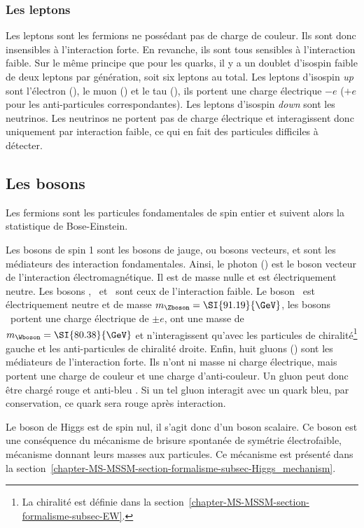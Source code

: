 \subsubsection{Les leptons}\label{chapter-MS-MSSM-section-SM_ptcs-subsec-fermions-subsubsec-leptons}
Les leptons sont les fermions ne possédant pas de charge de couleur. Ils sont donc insensibles à l'interaction forte. En revanche, ils sont tous sensibles à l'interaction faible.
Sur le même principe que pour les quarks, il y a un doublet d'isospin faible de deux leptons par génération, soit six leptons au total.
Les leptons d'isospin \emph{up} sont l'électron (\electron), le muon (\muon) et le tau (\leptau), ils portent une charge électrique $-e$ ($+e$ pour les anti-particules correspondantes). Les leptons d'isospin \emph{down} sont les neutrinos. Les neutrinos ne portent pas de charge électrique et interagissent donc uniquement par interaction faible, ce qui en fait des particules difficiles à détecter.


\subsection{Les bosons}\label{chapter-MS-MSSM-section-SM_ptcs-subsec-bosons}
Les fermions sont les particules fondamentales de spin entier et suivent alors la statistique de Bose-Einstein.
\par Les bosons de spin 1 sont les bosons de jauge, ou bosons vecteurs, et sont les médiateurs des interaction fondamentales.
Ainsi, le photon (\photon) est le boson vecteur de l'interaction électromagnétique. Il est de masse nulle et est électriquement neutre.
Les bosons \Wbosonplus, \Wbosonminus\ et \Zboson\ sont ceux de l'interaction faible. Le boson \Zboson\ est électriquement neutre et de masse $m_\Zboson=\SI{91.19}{\GeV}$, les bosons \Wboson\ portent une charge électrique de $\pm e$, ont une masse de $m_\Wboson=\SI{80.38}{\GeV}$ et n'interagissent qu'avec les particules de chiralité\footnote{La chiralité est définie dans la section~\ref{chapter-MS-MSSM-section-formalisme-subsec-EW}.} gauche et les anti-particules de chiralité droite.
Enfin, huit gluons (\gluon) sont les médiateurs de l'interaction forte. Ils n'ont ni masse ni charge électrique, mais portent une charge de couleur et une charge d'anti-couleur. Un gluon peut donc être chargé \og rouge et anti-bleu \fg{}. Si un tel gluon interagit avec un quark bleu, par conservation, ce quark sera rouge après interaction.
\par Le boson de Higgs est de spin nul, il s'agit donc d'un boson scalaire. Ce boson est une conséquence du mécanisme de brisure spontanée de symétrie électrofaible, mécanisme donnant leurs masses aux particules. Ce mécanisme est présenté dans la section~\ref{chapter-MS-MSSM-section-formalisme-subsec-Higgs_mechanism}.

%
%
